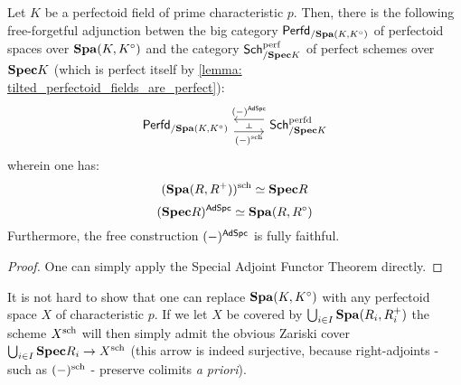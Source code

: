                 \begin{claim} 
                    Let $K$ be a perfectoid field of prime characteristic $p$. Then, there is the following free-forgetful adjunction betwen the big category $\mathsf{Perfd}_{/\mathbf{Spa}(K, K^{\circ})}$ of perfectoid spaces over $\mathbf{Spa}(K, K^{\circ})$ and the category $\mathsf{Sch}^{\mathrm{perf}}_{/\mathbf{Spec} K}$ of perfect schemes over $\mathbf{Spec} K$ (which is perfect itself by \ref{lemma: tilted_perfectoid_fields_are_perfect}):
                        $$
                            \begin{tikzcd}
                            	{\Perfd_{/\Spa(K, K^{\circ})}} & {\Sch^{\perfd}_{/\Spec K}}
                            	\arrow[""{name=0, anchor=center, inner sep=0}, "(-)^{\sch}"', shift right=2, from=1-1, to=1-2]
                            	\arrow[""{name=1, anchor=center, inner sep=0}, "{(-)^{\Ad\Spc}}"', shift right=2, from=1-2, to=1-1]
                            	\arrow["\dashv"{anchor=center, rotate=-90}, draw=none, from=1, to=0]
                            \end{tikzcd}
                        $$
                    wherein one has:
                        $$(\mathbf{Spa}(R, R^+))^{\mathrm{sch}} \simeq \mathbf{Spec} R$$
                        $$(\mathbf{Spec} R)^{\mathsf{Ad}\mathsf{Spc}} \simeq \mathbf{Spa}(R, R^{\circ})$$
                    Furthermore, the free construction $(-)^{\mathsf{Ad}\mathsf{Spc}}$ is fully faithful.
                \end{claim}
                    \begin{proof}
                        One can simply apply the Special Adjoint Functor Theorem directly.        
                    \end{proof}
                \begin{remark}
                    It is not hard to show that one can replace $\mathbf{Spa}(K, K^{\circ})$ with any perfectoid space $X$ of characteristic $p$. If we let $X$ be covered by $\bigcup_{i \in I} \mathbf{Spa}(R_i, R_i^+)$ the scheme $X^{\mathrm{sch}}$ will then simply admit the obvious Zariski cover $\bigcup_{i \in I} \mathbf{Spec} R_i \to X^{\mathrm{sch}}$ (this arrow is indeed surjective, because right-adjoints - such as $(-)^{\mathrm{sch}}$ - preserve colimits \textit{a priori}). 
                \end{remark}
                
